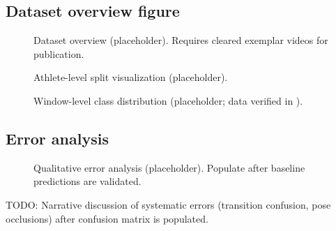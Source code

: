 \subsection{Dataset overview figure}
\label{sec:results:dataset_fig}

\begin{figure}[t]
  \centering
  \caption{Dataset overview (placeholder). Requires cleared exemplar videos for publication.}
  \label{fig:dataset_overview}
\end{figure}

\begin{figure}[t]
  \centering
  \caption{Athlete-level split visualization (placeholder).}
  \label{fig:split_visualization}
\end{figure}

\begin{figure}[t]
  \centering
  \caption{Window-level class distribution (placeholder; data verified in ).}
  \label{fig:class_distribution}
\end{figure}

\subsection{Error analysis}
\label{sec:results:error}

\begin{figure}[t]
  \centering
  \caption{Qualitative error analysis (placeholder). Populate after baseline predictions are validated.}
  \label{fig:error_analysis}
\end{figure}

\textsc{TODO:} Narrative discussion of systematic errors (transition confusion, pose occlusions) after confusion matrix is populated.
